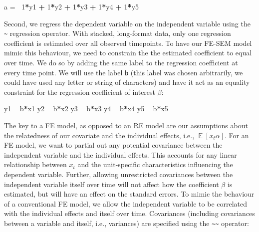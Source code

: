 \documentclass[
  12pt,
  a4paper]{article}
\newenvironment{Shaded}{\begin{snugshade}}{\end{snugshade}}
\newcommand{\DecValTok}[1]{\textcolor[rgb]{0.00,0.00,0.81}{#1}}
\newcommand{\ErrorTok}[1]{\textcolor[rgb]{0.64,0.00,0.00}{\textbf{#1}}}
\newcommand{\NormalTok}[1]{#1}
\newcommand{\OperatorTok}[1]{\textcolor[rgb]{0.81,0.36,0.00}{\textbf{#1}}}
\newcommand{\StringTok}[1]{\textcolor[rgb]{0.31,0.60,0.02}{#1}}
\DeclareMathOperator{\E}{\mathbb{E}}
\begin{document}
\singlespacing

\begin{Shaded}
\begin{Highlighting}[]
\NormalTok{a =}\ErrorTok{~}\StringTok{ }\DecValTok{1}\OperatorTok{*}\NormalTok{y1 }\OperatorTok{+}\StringTok{ }\DecValTok{1}\OperatorTok{*}\NormalTok{y2 }\OperatorTok{+}\StringTok{ }\DecValTok{1}\OperatorTok{*}\NormalTok{y3 }\OperatorTok{+}\StringTok{ }\DecValTok{1}\OperatorTok{*}\NormalTok{y4 }\OperatorTok{+}\StringTok{ }\DecValTok{1}\OperatorTok{*}\NormalTok{y5}
\end{Highlighting}
\end{Shaded}

\doublespacing

Second, we regress the dependent variable on the independent variable
using the \texttt{\textasciitilde{}} regression operator. With stacked,
long-format data, only one regression coefficient is estimated over all
observed timepoints. To have our FE-SEM model mimic this behaviour, we
need to constrain the the estimated coefficient to equal over time. We
do so by adding the same label to the regression coefficient at every
time point. We will use the label \texttt{b} (this label was chosen
arbitrarily, we could have used any letter or string of characters) and
have it act as an equality constraint for the regression coefficient of
interest \(\beta\):

\singlespacing

\begin{Shaded}
\begin{Highlighting}[]
\NormalTok{y1 }\OperatorTok{~}\StringTok{ }\NormalTok{b}\OperatorTok{*}\NormalTok{x1}
\NormalTok{y2 }\OperatorTok{~}\StringTok{ }\NormalTok{b}\OperatorTok{*}\NormalTok{x2 }
\NormalTok{y3 }\OperatorTok{~}\StringTok{ }\NormalTok{b}\OperatorTok{*}\NormalTok{x3}
\NormalTok{y4 }\OperatorTok{~}\StringTok{ }\NormalTok{b}\OperatorTok{*}\NormalTok{x4}
\NormalTok{y5 }\OperatorTok{~}\StringTok{ }\NormalTok{b}\OperatorTok{*}\NormalTok{x5}
\end{Highlighting}
\end{Shaded}

\doublespacing

The key to a FE model, as opposed to an RE model are our assumptions
about the relatedness of our covariate and the individual effects, i.e.,
\(\E[x_{t}\alpha]\). For an FE model, we want to partial out any
potential covariance between the independent variable and the individual
effects. This accounts for any linear relationship between \(x_{t}\) and
the unit-specific characteristics influencing the dependent variable.
Further, allowing unrestricted covariances between the independent
variable itself over time will not affect how the coefficient \(\beta\)
is estimated, but will have an effect on the standard errors. To mimic
the behaviour of a conventional FE model, we allow the independent
variable to be correlated with the individual effects and itself over
time. Covariances (including covariances between a variable and itself,
i.e., variances) are specified using the
\texttt{\textasciitilde{}\textasciitilde{}} operator:
\end{document}
